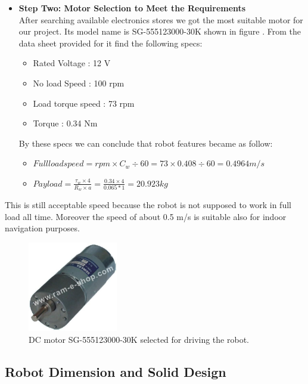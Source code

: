\documentclass[12pt]{article}
\begin{document}
\begin{itemize}
	\item \textbf{Step Two: Motor Selection to Meet the Requirements}\\
	After searching available electronics stores we got the most suitable motor for our project. Its model name is SG-555123000-30K shown in figure . From the data sheet provided for it find the following specs:\cite{204}
	\begin{itemize}
		\item Rated Voltage : 12 V
		\item No load Speed : 100 rpm
		\item Load torque speed : 73 rpm
		\item Torque : 0.34 Nm
	\end{itemize}
	By these specs we can conclude that robot features became as follow:
	\begin{itemize}
		\item ${Full  load  speed = rpm \times C_w \div 60 = 73 \times 0.408 \div 60 = 0.4964 m/s}$
		\item ${Pay load = \frac{ \tau_w \times 4}{ R_w \times a} = \frac{0.34 \times 4}{0.065 * 1} = 20.923 kg}$
		
	\end{itemize}
\end{itemize}

This is still acceptable speed because the robot is not supposed to work in full load all time. Moreover the speed of about 0.5 m/s is suitable also for indoor navigation purposes.

\begin{figure}[H]
	\centering
	\includegraphics[width =0.35\textwidth]{Fig/dc-motor.jpg}
	\caption{DC motor SG-555123000-30K selected for driving the robot.}
	\label{fig:dc-motor}
\end{figure}



\newpage

\subsection{Robot Dimension and Solid Design}
\end{document}
